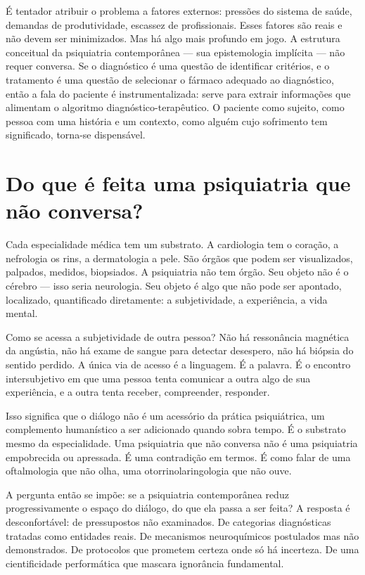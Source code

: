 É tentador atribuir o problema a fatores externos: pressões do sistema de saúde, demandas de produtividade, escassez de profissionais. Esses fatores são reais e não devem ser minimizados. Mas há algo mais profundo em jogo. A estrutura conceitual da psiquiatria contemporânea --- sua epistemologia implícita --- não requer conversa. Se o diagnóstico é uma questão de identificar critérios, e o tratamento é uma questão de selecionar o fármaco adequado ao diagnóstico, então a fala do paciente é instrumentalizada: serve para extrair informações que alimentam o algoritmo diagnóstico-terapêutico. O paciente como sujeito, como pessoa com uma história e um contexto, como alguém cujo sofrimento tem significado, torna-se dispensável.

\section{Do que é feita uma psiquiatria que não conversa?}
\label{sec:psiquiatria-sem-conversa}

Cada especialidade médica tem um substrato. A cardiologia tem o coração, a nefrologia os rins, a dermatologia a pele. São órgãos que podem ser visualizados, palpados, medidos, biopsiados. A psiquiatria não tem órgão. Seu objeto não é o cérebro --- isso seria neurologia. Seu objeto é algo que não pode ser apontado, localizado, quantificado diretamente: a subjetividade, a experiência, a vida mental.

Como se acessa a subjetividade de outra pessoa? Não há ressonância magnética da angústia, não há exame de sangue para detectar desespero, não há biópsia do sentido perdido. A única via de acesso é a linguagem. É a palavra. É o encontro intersubjetivo em que uma pessoa tenta comunicar a outra algo de sua experiência, e a outra tenta receber, compreender, responder.

Isso significa que o diálogo não é um acessório da prática psiquiátrica, um complemento humanístico a ser adicionado quando sobra tempo. É o substrato mesmo da especialidade. Uma psiquiatria que não conversa não é uma psiquiatria empobrecida ou apressada. É uma contradição em termos. É como falar de uma oftalmologia que não olha, uma otorrinolaringologia que não ouve.

A pergunta então se impõe: se a psiquiatria contemporânea reduz progressivamente o espaço do diálogo, do que ela passa a ser feita? A resposta é desconfortável: de pressupostos não examinados. De categorias diagnósticas tratadas como entidades reais. De mecanismos neuroquímicos postulados mas não demonstrados. De protocolos que prometem certeza onde só há incerteza. De uma cientificidade performática que mascara ignorância fundamental.

